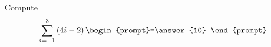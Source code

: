 \documentclass{ximera}
\author{Gregory Hartman \and Matthew Carr}
\begin{document}
\begin{exercise}

Compute
\[
\sum_{i=-1}^{3}\left(4i-2\right)\begin{prompt}=\answer{10}
\end{prompt}
\]

\end{exercise}
\end{document}
